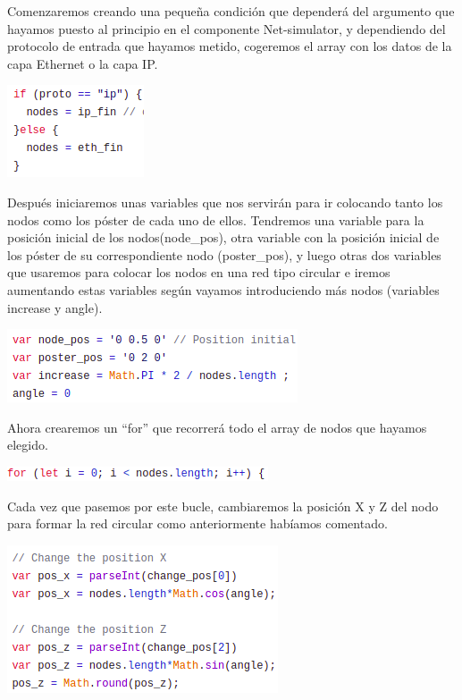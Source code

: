 \documentclass[a4paper, 12pt]{book}
\begin{document}
Comenzaremos creando una pequeña condición que dependerá del argumento que hayamos puesto al principio en el componente Net-simulator, y dependiendo del protocolo de entrada que hayamos metido, cogeremos el array con los datos de la capa Ethernet o la capa IP.


\begin{center}
    \includegraphics[scale=0.7]{img/condproto_comp_netsim.png}
\end{center}

Después iniciaremos unas variables que nos servirán para ir colocando tanto los nodos como los póster de cada uno de ellos. Tendremos una variable para la posición inicial de los nodos(node\_pos), otra variable con la posición inicial de los póster de su correspondiente nodo (poster\_pos), y luego otras dos variables que usaremos para colocar los nodos en una red tipo circular e iremos aumentando estas variables según vayamos introduciendo más nodos (variables increase y angle).

\begin{center}
    \includegraphics[scale=0.7]{img/varini_comp_netsim.png}
\end{center}


Ahora crearemos un “for” que recorrerá todo el array de nodos que hayamos elegido.

\begin{center}
    \includegraphics[scale=0.7]{img/fornode_comp_netsim.png}
\end{center}

Cada vez que pasemos por este bucle, cambiaremos la posición X y Z del nodo para formar la red circular como anteriormente habíamos comentado.

\begin{center}
    \includegraphics[scale=0.7]{img/posXZ_comp_netsim.png}
\end{center}
\end{document}
